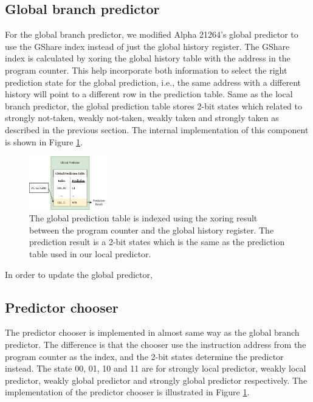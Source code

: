 \documentclass[conference]{IEEEtran}
\begin{document}
\subsection{Global branch predictor}

For the global branch predictor, we modified Alpha 21264's global predictor to use the GShare index
instead of just the global history register. The GShare index is calculated by xoring the global history
table with the address in the program counter. This help incorporate both information to select the right
prediction state for the global prediction, i.e., the same address with a different history will point to a
different row in the prediction table. Same as the local branch predictor, the global prediction table stores
2-bit states which related to strongly not-taken, weakly not-taken, weakly taken and strongly taken as described
in the previous section. The internal implementation of this component is shown in Figure \ref{fig:global_predictor}.

\begin{figure}[h]
    \centering
    \includegraphics[width=0.3\textwidth]{imgs/global_predictor}
    \caption{The global prediction table is indexed using the xoring result between the program counter and
    the global history register. The prediction result is a 2-bit states which is the same as the prediction
    table used in our local predictor.}
    \label{fig:global_predictor}
\end{figure}

In order to update the global predictor,

\subsection{Predictor chooser}

The predictor chooser is implemented in almost same way as the global branch predictor. The difference is that the chooser
use the instruction address from the program counter as the index, and the 2-bit states determine the
predictor instead. The state 00, 01, 10 and 11 are for strongly local predictor, weakly local predictor,
weakly global predictor and strongly global predictor respectively. The implementation of the predictor chooser
is illustrated in Figure \ref{fig:global_predictor}.
\end{document}
